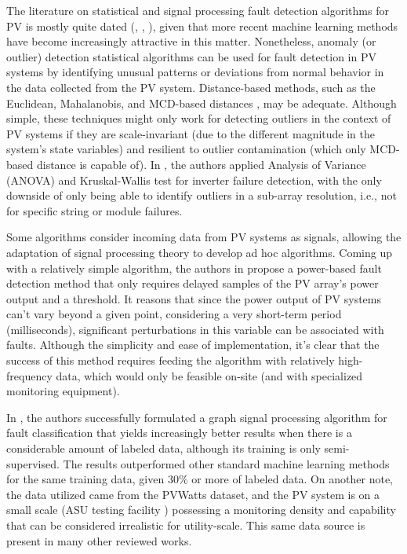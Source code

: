 The literature on statistical and signal processing fault detection algorithms for PV is mostly quite dated (\cite{Buddha2012}, \cite{Zhao2014}, \cite{Vergura2008}), given that more recent machine learning methods have become increasingly attractive in this matter. Nonetheless, anomaly (or outlier) detection statistical algorithms can be used for fault detection in PV systems by identifying unusual patterns or deviations from normal behavior in the data collected from the PV system. Distance-based methods, such as the Euclidean, Mahalanobis, and MCD-based distances \cite{Braun2011}, may be adequate. Although simple, these techniques might only work for detecting outliers in the context of PV systems if they are scale-invariant (due to the different magnitude in the system's state variables) and resilient to outlier contamination (which only MCD-based distance is capable of). In \cite{Vergura2008}, the authors applied Analysis of Variance (ANOVA) and Kruskal-Wallis test for inverter failure detection, with the only downside of only being able to identify outliers in a sub-array resolution, i.e., not for specific string or module failures.

Some algorithms consider incoming data from PV systems as signals, allowing the adaptation of signal processing theory to develop ad hoc algorithms. Coming up with a relatively simple algorithm, the authors in \cite{Iles2021} propose a power-based fault detection method that only requires delayed samples of the PV array's power output and a threshold. It reasons that since the power output of PV systems can't vary beyond a given point, considering a very short-term period (milliseconds), significant perturbations in this variable can be associated with faults. Although the simplicity and ease of implementation, it's clear that the success of this method requires feeding the algorithm with relatively high-frequency data, which would only be feasible on-site (and with specialized monitoring equipment).

In \cite{Fan2020}, the authors successfully formulated a graph signal processing algorithm for fault classification that yields increasingly better results when there is a considerable amount of labeled data, although its training is only semi-supervised. The results outperformed other standard machine learning methods for the same training data, given 30\% or more of labeled data. On another note, the data utilized came from the PVWatts \cite{Dobos2013} dataset, and the PV system is on a small scale (ASU testing facility \cite{Rao2016}) possessing a monitoring density and capability that can be considered irrealistic for utility-scale. This same data source is present in many other reviewed works.

